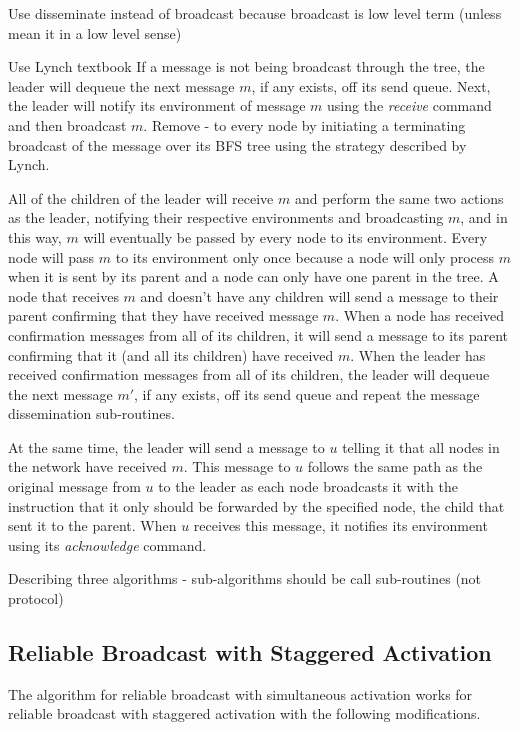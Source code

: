 \documentclass[english]{article}
\begin{document}
Use disseminate instead of broadcast because broadcast is low level term (unless mean it in a low level sense)

Use Lynch textbook 
If a message is not being broadcast through the tree, the leader will dequeue the next message $m$, if any exists, off its send queue. Next, the leader will notify its environment of message $m$ using the \textit{receive} command and then broadcast $m$. Remove - to every node by initiating a terminating broadcast of the message over its BFS tree using the strategy described by Lynch.

 All of the children of the leader will receive $m$ and perform the same two actions as the leader, notifying their respective environments and broadcasting $m$, and in this way, $m$ will eventually be passed by every node to its environment. Every node will pass $m$ to its environment only once because a node will only process $m$ when it is sent by its parent and a node can only have one parent in the tree. A node that receives $m$ and doesn't have any children will send a message to their parent confirming that they have received message $m$. When a node has received confirmation messages from all of its children, it will send a message to its parent confirming that it (and all its children) have received $m$. When the leader has received confirmation messages from all of its children, the leader will dequeue the next message $m'$, if any exists, off its send queue and repeat the message dissemination sub-routines. 

At the same time, the leader will send a message to $u$ telling it that all nodes in the network have received $m$. This message to $u$ follows the same path as the original message from $u$ to the leader as each node broadcasts it with the instruction that it only should be forwarded by the specified node, the child that sent it to the parent. When $u$ receives this message, it notifies its environment using its \textit{acknowledge} command.

Describing three algorithms - sub-algorithms should be call sub-routines (not protocol)

  \subsection {Reliable Broadcast with Staggered Activation}

The algorithm for reliable broadcast with simultaneous activation works for reliable broadcast with staggered activation with the following modifications.
\end{document}
